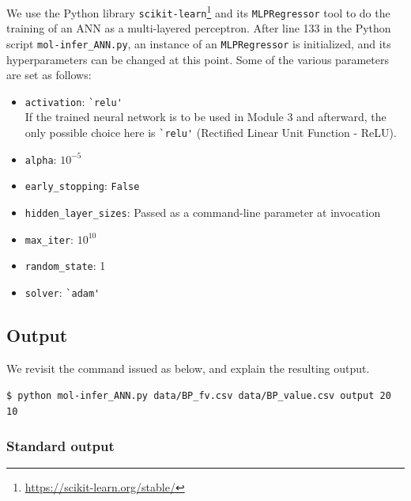 \documentclass[11pt, titlepage, dvipdfmx, twoside]{article}
\begin{document}
We use the Python  library {\tt scikit-learn}\footnote{\url{https://scikit-learn.org/stable/}}
and its {\tt MLPRegressor} tool
to do the training of an ANN as
a multi-layered perceptron.
After line 133 in the Python script 
\verb|mol-infer_ANN.py|, an instance of 
an \verb|MLPRegressor| is initialized, 
and its hyperparameters can be changed at this point.
Some of the various parameters are set as follows:
\begin{itemize}
\item \verb|activation|: \verb|`relu'|  \\
{\color{red}{\bf Attention:} 
If the trained neural network is to be used in Module 3 and afterward, 
the only possible choice here is
\verb|`relu'| (Rectified Linear Unit Function - ReLU).}
\item \verb|alpha|: $10^{-5}$
\item \verb|early_stopping|: \verb|False|
\item \verb|hidden_layer_sizes|: Passed as a command-line parameter at invocation
\item \verb|max_iter|: $10^{10}$
\item \verb|random_state|: 1
\item \verb|solver|: \verb|`adam'|
\end{itemize}


\subsection{Output}

We revisit the command issued as below, 
and explain the resulting output.
\begin{oframed}
{\small
\verb|$ python mol-infer_ANN.py data/BP_fv.csv data/BP_value.csv output 20 10|
}
\end{oframed}

\subsubsection{Standard output}
\end{document}
